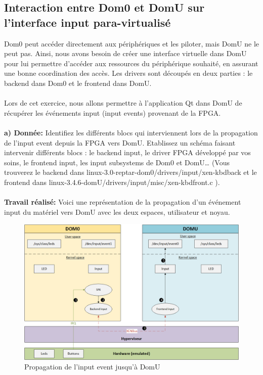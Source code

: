 \subsection{Interaction entre Dom0 et DomU sur l'interface input para-virtualisé}
Dom0 peut accéder directement aux périphériques et les piloter, mais DomU ne le peut pas. Ainsi, nous
avons besoin de créer une interface virtuelle dans DomU pour lui permettre d’accéder aux ressources
du périphérique souhaité, en assurant une bonne coordination des accès. Les drivers sont découpés en
deux parties : le backend dans Dom0 et le frontend dans DomU.\\\\
Lors de cet exercice, nous allons permettre à l’application Qt dans DomU de récupérer les événements
input (input events) provenant de la FPGA.\\\\
\textbf{a) Donnée: }Identifiez les différents blocs qui interviennent lors de la propagation de l’input event depuis la
FPGA vers DomU. Etablissez un schéma faisant intervenir différents blocs : le backend input, le
driver FPGA développé par vos soins, le frontend input, les input subsystems de Dom0 et DomU…
(Vous trouverez le backend dans linux-3.0-reptar-dom0/drivers/input/xen-kbdback et le frontend
dans linux-3.4.6-domU/drivers/input/misc/xen-kbdfront.c ).\\\\
\textbf{Travail réalisé: }Voici une représentation de la propagation d'un événement input du matériel vers DomU avec les deux espaces, utilisateur et noyau.
\begin{figure}[H]
	\begin{center}
		\includegraphics[width=17cm]{img/virt1.png}
		\caption{Propagation de l'input event jusqu'à DomU}
		\label{virt1}
	\end{center}
\end{figure}
